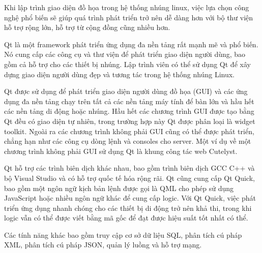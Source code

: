 Khi lập trình giao diện đồ họa trong hệ thống nhúng linux, việc lựa chọn công nghệ phổ biến sẽ giúp quá trình phát triển trở nên dễ dàng hơn với bộ thư viện hỗ trợ rộng lớn, hỗ trợ từ cộng đồng cũng nhiều hơn.

Qt là một framework phát triển ứng dụng đa nền tảng rất mạnh mẽ và phổ biến. Nó cung cấp các công cụ và thư viện để phát triển giao diện người dùng, bao gồm cả hỗ trợ cho các thiết bị nhúng. Lập trình viên có thể sử dụng Qt để xây dựng giao diện người dùng đẹp và tương tác trong hệ thống nhúng Linux.

Qt được sử dụng để phát triển giao diện người dùng đồ họa (GUI) và các ứng dụng đa nền tảng chạy trên tất cả các nền tảng máy tính để bàn lớn và hầu hết các nền tảng di động hoặc nhúng. Hầu hết các chương trình GUI được tạo bằng Qt đều có giao diện tự nhiên, trong trường hợp này Qt được phân loại là widget toolkit. Ngoài ra các chương trình không phải GUI cũng có thể được phát triển, chẳng hạn như các công cụ dòng lệnh và consoles cho server. Một ví dụ về một chương trình không phải GUI sử dụng Qt là khung công tác web Cutelyst.

Qt hỗ trợ các trình biên dịch khác nhau, bao gồm trình biên dịch GCC C++ và bộ Visual Studio và có hỗ trợ quốc tế hóa rộng rãi. Qt cũng cung cấp Qt Quick, bao gồm một ngôn ngữ kịch bản lệnh được gọi là QML cho phép sử dụng JavaScript hoặc nhiều ngôn ngữ khác để cung cấp logic. Với Qt Quick, việc phát triển ứng dụng nhanh chóng cho các thiết bị di động trở nên khả thi, trong khi logic vẫn có thể được viết bằng mã gốc để đạt được hiệu suất tốt nhất có thể.

Các tính năng khác bao gồm truy cập cơ sở dữ liệu SQL, phân tích cú pháp XML, phân tích cú pháp JSON, quản lý luồng và hỗ trợ mạng. 

